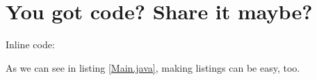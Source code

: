 \chapter{You got code? Share it maybe?}

Inline code: 

As we can see in listing \ref{Main.java}, making listings can be easy, too.


